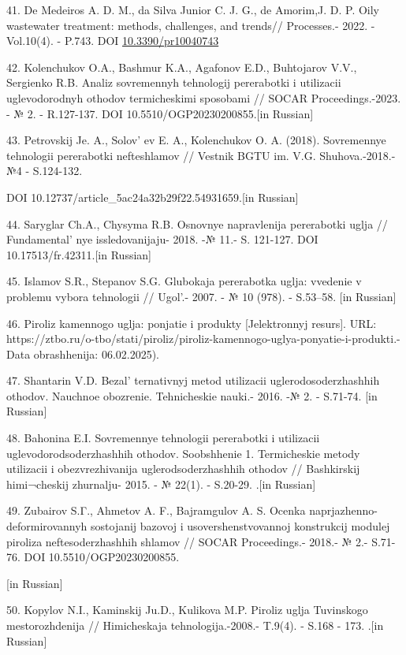 \begin{references}
41. De Medeiros A. D. M., da Silva Junior C. J. G., de Amorim,J. D. P.
Oily wastewater treatment: methods, challenges, and trends// Processes.-
2022. - Vol.10(4). - P.743. DOI
\href{http://dx.doi.org/10.3390/pr10040743}{10.3390/pr10040743}

42. Kolenchukov O.A., Bashmur K.A., Agafonov E.D., Buhtojarov V.V.,
Sergienko R.B. Analiz sovremennyh tehnologij pererabotki i utilizacii
uglevodorodnyh othodov termicheskimi sposobami // SOCAR
Proceedings.-2023. - № 2. - R.127-137. DOI 10.5510/OGP20230200855.{[}in
Russian{]}

43. Petrovskij Je. A., Solov' ev E. A., Kolenchukov O. A.
(2018). Sovremennye tehnologii pererabotki nefteshlamov // Vestnik BGTU
im. V.G. Shuhova.-2018.- №4 - S.124-132.

DOI 10.12737/article\_5ac24a32b29f22.54931659.{[}in Russian{]}

44. Saryglar Ch.A., Chysyma R.B. Osnovnye napravlenija pererabotki uglja
// Fundamental' nye issledovanijaju- 2018. -№ 11.- S.
121-127. DOI 10.17513/fr.42311.{[}in Russian{]}

45. Islamov S.R., Stepanov S.G. Glubokaja pererabotka uglja: vvedenie v
problemu vybora tehnologii // Ugol'.- 2007. - № 10 (978).
- S.53--58. {[}in Russian{]}

46. Piroliz kamennogo uglja: ponjatie i produkty {[}Jelektronnyj
resurs{]}. URL:
https://ztbo.ru/o-tbo/stati/piroliz/piroliz-kamennogo-uglya-ponyatie-i-produkti.-Data
obrashhenija: 06.02.2025).

47. Shantarin V.D. Bezal' ternativnyj metod utilizacii
uglerodosoderzhashhih othodov. Nauchnoe obozrenie. Tehnicheskie nauki.-
2016. -№ 2. - S.71-74. {[}in Russian{]}

48. Bahonina E.I. Sovremennye tehnologii pererabotki i utilizacii
uglevodorodsoderzhashhih othodov. Soobshhenie 1. Termicheskie metody
utilizacii i obezvrezhivanija uglerodsoderzhashhih othodov //
Bashkirskij himi¬cheskij zhurnalju- 2015. - № 22(1). - S.20-29. .{[}in
Russian{]}

49. Zubairov S.Γ., Ahmetov A. F., Bajramgulov A. S. Ocenka
naprjazhenno-deformirovannyh sostojanij bazovoj i usovershenstvovannoj
konstrukcij modulej piroliza neftesoderzhashhih shlamov // SOCAR
Proceedings.- 2018.- № 2.- S.71-76. DOI 10.5510/OGP20230200855.

{[}in Russian{]}

50. Kopylov N.I., Kaminskij Ju.D., Kulikova M.P. Piroliz uglja
Tuvinskogo mestorozhdenija // Himicheskaja tehnologija.-2008.- T.9(4).
- S.168 - 173. .{[}in Russian{]}


\end{references}
